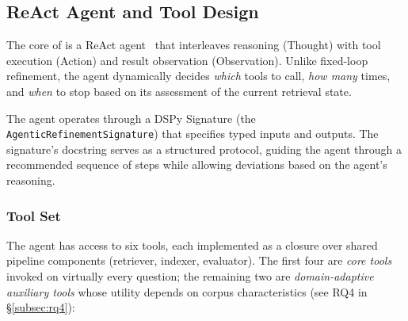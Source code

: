 \subsection{ReAct Agent and Tool Design}
\label{subsec:agent}

The core of \ours{} is a ReAct agent~\cite{yao2023react} that interleaves reasoning (Thought) with tool execution (Action) and result observation (Observation).
Unlike fixed-loop refinement, the agent dynamically decides \emph{which} tools to call, \emph{how many} times, and \emph{when} to stop based on its assessment of the current retrieval state.

The agent operates through a DSPy Signature (the \texttt{AgenticRefinement\-Signature}) that specifies typed inputs and outputs.
The signature's docstring serves as a structured protocol, guiding the agent through a recommended sequence of steps while allowing deviations based on the agent's reasoning.

\subsubsection{Tool Set}
\label{subsubsec:tools}

The agent has access to six tools, each implemented as a closure over shared pipeline components (retriever, indexer, evaluator).
The first four are \emph{core tools} invoked on virtually every question; the remaining two are \emph{domain-adaptive auxiliary tools} whose utility depends on corpus characteristics (see RQ4 in \S\ref{subsec:rq4}):

